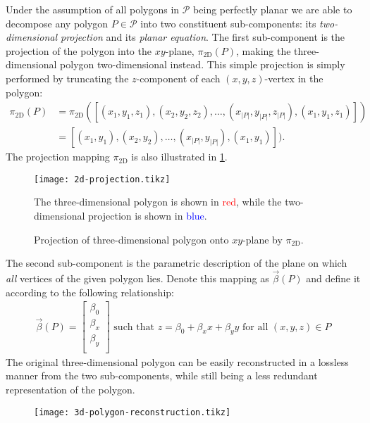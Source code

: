 Under the assumption of all polygons in $\mathcal{P}$ being perfectly planar we are able to decompose any polygon $P \in \mathcal{P}$ into two constituent sub-components: its \textit{two-dimensional projection} and its \textit{planar equation}.
The first sub-component is the projection of the polygon into the $xy$-plane, $\pi_{\mathrm{2D}}(P)$, making the three-dimensional polygon two-dimensional instead.
This simple projection is simply performed by truncating the $z$-component of each $(x, y, z)$-vertex in the polygon:
\begin{align*}
  \pi_{\mathrm{2D}}(P)
  &=
  \pi_{\mathrm{2D}}([(x_1, y_1, z_1), (x_2, y_2, z_2), \dots, (x_{|P|}, y_{|P|}, z_{|P|}), (x_1, y_1, z_1)])
  \\
  &=
  [(x_1, y_1), (x_2, y_2), \dots, (x_{|P|}, y_{|P|}), (x_1, y_1)]).
\end{align*}
The projection mapping $\pi_{\mathrm{2D}}$ is also illustrated in \cref{fig:2d-polygon-projection}.
\begin{figure}
  \centering
  \texttt{[image: 2d-projection.tikz]}
  \caption{%
    Projection of three-dimensional polygon onto $xy$-plane by $\pi_{\mathrm{2D}}$.
  }{%
    The three-dimensional polygon is shown in \textcolor{red}{red}, while the two-dimensional projection is shown in \textcolor{blue}{blue}.
  }%
  \label{fig:2d-polygon-projection}
\end{figure}

The second sub-component is the parametric description of the plane on which \emph{all} vertices of the given polygon lies.
Denote this mapping as $\vec{\beta}(P)$ and define it according to the following relationship:
\begin{align*}
  \vec{\beta}(P)
  =
  \begin{bmatrix}
    \beta_0 \\
    \beta_x \\
    \beta_y \\
  \end{bmatrix}
  \text{ such that }
  z = \beta_0 + \beta_x x + \beta_y y \text{ for all } (x, y, z) \in P
\end{align*}
The original three-dimensional polygon can be easily reconstructed in a lossless manner from the two sub-components, while still being a less redundant representation of the polygon.
\begin{figure}
  \centering
  \texttt{[image: 3d-polygon-reconstruction.tikz]}
\end{figure}

